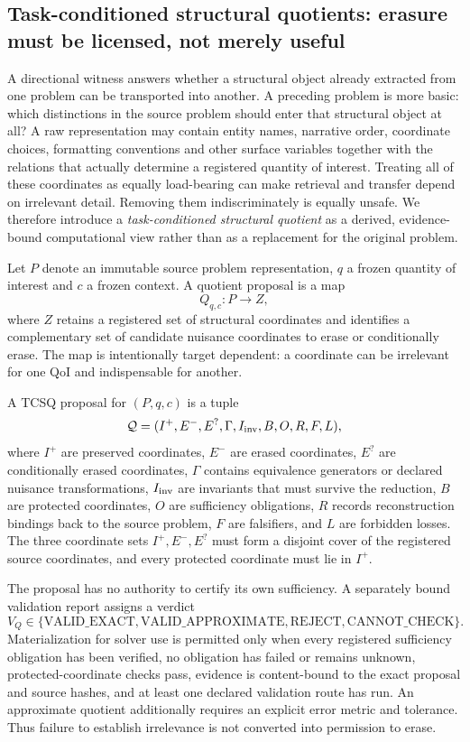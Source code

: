 \subsection{Task-conditioned structural quotients: erasure must be licensed, not merely useful}
\label{sec:tcsq}

A directional witness answers whether a structural object already extracted from one problem can be transported into another. A preceding problem is more basic: which distinctions in the source problem should enter that structural object at all? A raw representation may contain entity names, narrative order, coordinate choices, formatting conventions and other surface variables together with the relations that actually determine a registered quantity of interest. Treating all of these coordinates as equally load-bearing can make retrieval and transfer depend on irrelevant detail. Removing them indiscriminately is equally unsafe. We therefore introduce a \emph{task-conditioned structural quotient} as a derived, evidence-bound computational view rather than as a replacement for the original problem.

Let $P$ denote an immutable source problem representation, $q$ a frozen quantity of interest and $c$ a frozen context. A quotient proposal is a map
\[
Q_{q,c}:P\longrightarrow Z,
\]
where $Z$ retains a registered set of structural coordinates and identifies a complementary set of candidate nuisance coordinates to erase or conditionally erase. The map is intentionally target dependent: a coordinate can be irrelevant for one QoI and indispensable for another.

\begin{definition}
A TCSQ proposal for $(P,q,c)$ is a tuple
\[
\mathcal Q=(I^+,E^-,E^?,\Gamma,I_{\rm inv},B,O,R,F,L),
\]
where $I^+$ are preserved coordinates, $E^-$ are erased coordinates, $E^?$ are conditionally erased coordinates, $\Gamma$ contains equivalence generators or declared nuisance transformations, $I_{\rm inv}$ are invariants that must survive the reduction, $B$ are protected coordinates, $O$ are sufficiency obligations, $R$ records reconstruction bindings back to the source problem, $F$ are falsifiers, and $L$ are forbidden losses. The three coordinate sets $I^+,E^-,E^?$ must form a disjoint cover of the registered source coordinates, and every protected coordinate must lie in $I^+$.
\end{definition}

The proposal has no authority to certify its own sufficiency. A separately bound validation report assigns a verdict
\[
V_Q\in\{\mathrm{VALID\_EXACT},\mathrm{VALID\_APPROXIMATE},\mathrm{REJECT},\mathrm{CANNOT\_CHECK}\}.
\]
Materialization for solver use is permitted only when every registered sufficiency obligation has been verified, no obligation has failed or remains unknown, protected-coordinate checks pass, evidence is content-bound to the exact proposal and source hashes, and at least one declared validation route has run. An approximate quotient additionally requires an explicit error metric and tolerance. Thus failure to establish irrelevance is not converted into permission to erase.


